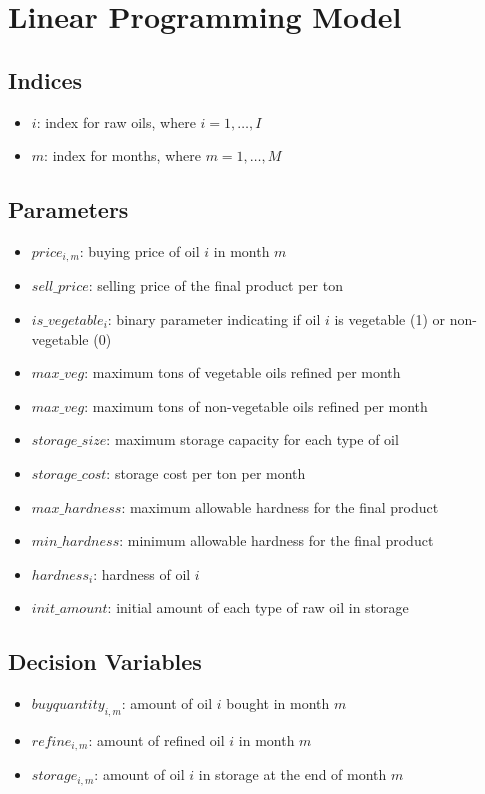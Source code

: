 \documentclass{article}
\begin{document}
\section*{Linear Programming Model}

\subsection*{Indices}
\begin{itemize}
    \item $i$: index for raw oils, where $i = 1, \ldots, I$
    \item $m$: index for months, where $m = 1, \ldots, M$
\end{itemize}

\subsection*{Parameters}
\begin{itemize}
    \item $price_{i,m}$: buying price of oil $i$ in month $m$
    \item $sell\_price$: selling price of the final product per ton
    \item $is\_vegetable_{i}$: binary parameter indicating if oil $i$ is vegetable (1) or non-vegetable (0)
    \item $max\_veg$: maximum tons of vegetable oils refined per month
    \item $max\_veg$: maximum tons of non-vegetable oils refined per month
    \item $storage\_size$: maximum storage capacity for each type of oil
    \item $storage\_cost$: storage cost per ton per month
    \item $max\_hardness$: maximum allowable hardness for the final product
    \item $min\_hardness$: minimum allowable hardness for the final product
    \item $hardness_{i}$: hardness of oil $i$
    \item $init\_amount$: initial amount of each type of raw oil in storage
\end{itemize}

\subsection*{Decision Variables}
\begin{itemize}
    \item $buyquantity_{i,m}$: amount of oil $i$ bought in month $m$
    \item $refine_{i,m}$: amount of refined oil $i$ in month $m$
    \item $storage_{i,m}$: amount of oil $i$ in storage at the end of month $m$
\end{itemize}
\end{document}
